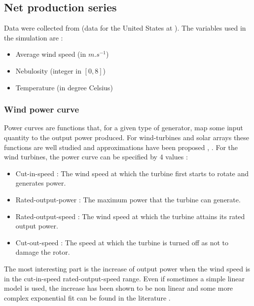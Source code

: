 \documentclass[journal]{IEEEtran}
\begin{document}

\subsection{Net production series}
\label{appendixB}

Data were collected from \cite{Infoclimat} (data for the United States at \cite{NCDC}). The variables used in the simulation are :


\begin{itemize}
	\item Average wind speed (in $m.s^{-1}$)
	\item Nebulosity (integer in $[0,8] $)
	\item Temperature (in degree Celsius)
\end{itemize} 


\subsubsection{Wind power curve}
Power curves are functions that, for a given type of generator, map some input quantity to the output power produced. For wind-turbines and solar arrays these functions are well studied and approximations have been proposed \cite{Lydia2014} \cite{Piedallu2007}, \cite{Piedallu2008}. For the wind turbines, the power curve can be specified by 4 values :


\begin{itemize}
	\item Cut-in-speed : The wind speed at which the turbine first starts to rotate and generates power.
	\item Rated-output-power : The maximum power that the turbine can generate.
	\item Rated-output-speed : The wind speed at which the turbine attains its rated output power.
	\item Cut-out-speed : The speed at which the turbine is turned off as not to damage the rotor.
\end{itemize}


The most interesting part is the increase of output power when the wind speed is in the cut-in-speed rated-output-speed range. Even if sometimes a simple linear model is used, the increase has been shown to be non linear and some more complex exponential fit can be found in the literature \cite{Lydia2014}.
\end{document}
